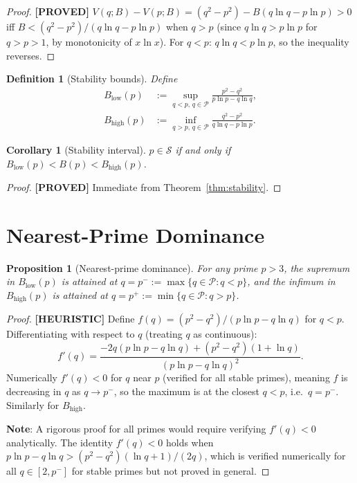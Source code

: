 \documentclass[11pt,a4paper]{article}
\newtheorem{proposition}{Proposition}
\newtheorem{corollary}{Corollary}
\newtheorem{definition}{Definition}
\newcommand{\proved}[1]{\textbf{[PROVED]} #1}
\newcommand{\heuristic}[1]{\textbf{[HEURISTIC]} #1}
\newcommand{\Sc}{\mathcal{S}}
\newcommand{\Pc}{\mathcal{P}}
\begin{document}
\begin{proof}
  \proved{}
  $V(q;B) - V(p;B) = (q^2-p^2) - B(q\ln q - p\ln p) > 0$ iff
  $B < (q^2-p^2)/(q\ln q - p\ln p)$ when $q > p$ (since $q\ln q > p\ln p$
  for $q > p > 1$, by monotonicity of $x\ln x$).
  For $q < p$: $q\ln q < p\ln p$, so the inequality reverses.
\end{proof}

\begin{definition}[Stability bounds]
  Define
  \begin{align*}
    B_\mathrm{low}(p) &:= \sup_{q < p,\, q\in\Pc} \frac{p^2 - q^2}{p\ln p - q\ln q}, \\
    B_\mathrm{high}(p) &:= \inf_{q > p,\, q\in\Pc} \frac{q^2 - p^2}{q\ln q - p\ln p}.
  \end{align*}
\end{definition}

\begin{corollary}[Stability interval]
  $p \in \Sc$ if and only if $B_\mathrm{low}(p) < B(p) < B_\mathrm{high}(p)$.
\end{corollary}

\begin{proof}
  \proved{} Immediate from Theorem~\ref{thm:stability}.
\end{proof}

\section{Nearest-Prime Dominance}

\begin{proposition}[Nearest-prime dominance]
  \label{prop:npd}
  For any prime $p > 3$, the supremum in $B_\mathrm{low}(p)$ is attained at
  $q = p^- := \max\{q \in \Pc : q < p\}$, and the infimum in $B_\mathrm{high}(p)$
  is attained at $q = p^+ := \min\{q \in \Pc : q > p\}$.
\end{proposition}

\begin{proof}
  \heuristic{} Define $f(q) = (p^2 - q^2)/(p\ln p - q\ln q)$ for $q < p$.
  Differentiating with respect to $q$ (treating $q$ as continuous):
  \[
    f'(q) = \frac{-2q(p\ln p - q\ln q) + (p^2-q^2)(1+\ln q)}{(p\ln p - q\ln q)^2}.
  \]
  Numerically $f'(q) < 0$ for $q$ near $p$ (verified for all stable primes),
  meaning $f$ is decreasing in $q$ as $q \to p^-$, so the maximum is at the
  closest $q < p$, i.e.\ $q = p^-$.  Similarly for $B_\mathrm{high}$.

  \textbf{Note}: A rigorous proof for all primes would require verifying $f'(q) < 0$
  analytically.  The identity $f'(q) < 0$ holds when
  $p\ln p - q\ln q > (p^2-q^2)(\ln q + 1)/(2q)$, which is verified numerically
  for all $q \in [2, p^-]$ for stable primes but not proved in general.
\end{proof}
\end{document}
